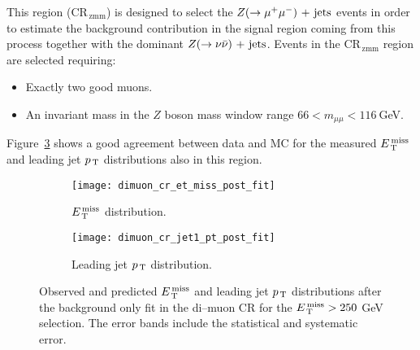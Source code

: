 This region (CR$_\mathrm{\, zmm}$) is designed to select the $Z (\rightarrow \mu^+ \mu^-)\mathrm{~+~jets}$
events in order to estimate the background contribution in the signal region
coming from this process together with the dominant $Z (\rightarrow \nu \bar{\nu})\mathrm{~+~jets}$. Events in
the CR$_\mathrm{\, zmm}$ region are selected requiring:
\begin{itemize}
\item Exactly two good muons.
\item An invariant mass in the $Z$ boson mass window range
  $66 < m_{\mu \mu} < 116~$GeV.
\end{itemize}
Figure~\ref{fig:dimuon_cr_plots} shows a good agreement between data and MC for
the measured $E_\mathrm{\, T}^\mathrm{\, miss}$ and leading jet $p_\mathrm{\, T}$ distributions also in this region.

\begin{figure}[!h]
  \centering
  \begin{subfigure}[t]{.48\linewidth}
    \texttt{[image: dimuon\_cr\_et\_miss\_post\_fit]}
    \caption{$E_\mathrm{\, T}^\mathrm{\, miss}$ distribution.}
    \label{fig:dimuon_cr_et_miss_pre_fit}
  \end{subfigure}
  \begin{subfigure}[t]{.48\linewidth}
    \texttt{[image: dimuon\_cr\_jet1\_pt\_post\_fit]}
    \caption{Leading jet $p_\mathrm{\, T}$ distribution.}
    \label{fig:dimuon_cr_jet1_pt_pre_fit}
  \end{subfigure}
  \caption{Observed and predicted $E_\mathrm{\, T}^\mathrm{\, miss}$ and leading jet $p_\mathrm{\, T}$ distributions
    after the background only fit in the di--muon CR for the $E_\mathrm{\, T}^\mathrm{\, miss} > 250~$GeV
    selection. The error bands include the statistical and systematic error.}
  \label{fig:dimuon_cr_plots}
\end{figure}
